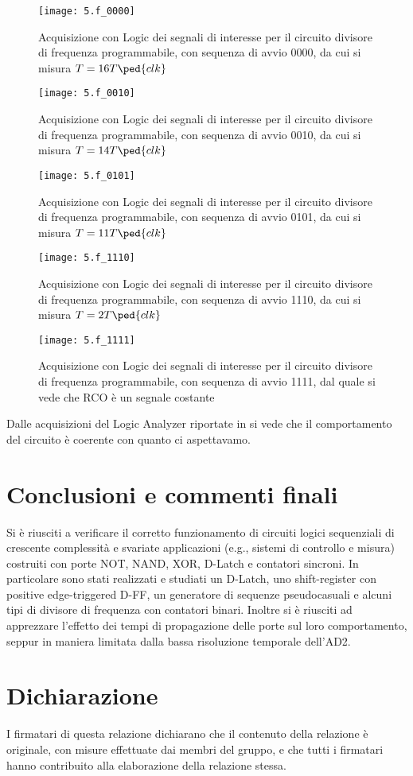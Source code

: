 \documentclass[10pt, a4paper, italian]{article}
\begin{document}
\begin{figure}[htbp]
\centering
	\texttt{[image: 5.f\_0000]}
	\caption{Acquisizione con Logic dei segnali di interesse per il circuito divisore di frequenza programmabile, con sequenza di avvio 0000, da cui si misura $T = 16 T\ped{clk}$
	 \label{fig: RCO_0000}}
\end{figure}
\begin{figure}[htbp]
\centering
	\texttt{[image: 5.f\_0010]}
	\caption{Acquisizione con Logic dei segnali di interesse per il circuito divisore di frequenza programmabile, con sequenza di avvio 0010, da cui si misura $T = 14 T\ped{clk}$
	 \label{fig: RCO_0010}}
\end{figure}
\begin{figure}[htbp]
\centering
	\texttt{[image: 5.f\_0101]}
	\caption{Acquisizione con Logic dei segnali di interesse per il circuito divisore di frequenza programmabile, con sequenza di avvio 0101, da cui si misura $T = 11 T\ped{clk}$
	 \label{fig: RCO_0101}}
\end{figure}
\begin{figure}[htbp]
\centering
	\texttt{[image: 5.f\_1110]}
	\caption{Acquisizione con Logic dei segnali di interesse per il circuito divisore di frequenza programmabile, con sequenza di avvio 1110, da cui si misura $T = 2 T\ped{clk}$
	 \label{fig: RCO_1110}}
\end{figure}
\begin{figure}[htbp]
\centering
	\texttt{[image: 5.f\_1111]}
	\caption{Acquisizione con Logic dei segnali di interesse per il circuito divisore di frequenza programmabile, con sequenza di avvio 1111, dal quale si vede che RCO è un segnale costante \label{fig: RCO_1111}}
\end{figure}

Dalle acquisizioni del Logic Analyzer riportate in si vede che il comportamento
del circuito è coerente con quanto ci aspettavamo.
\fi

\section*{Conclusioni e commenti finali}
Si è riusciti a verificare il corretto funzionamento di circuiti logici
sequenziali di crescente complessità e svariate applicazioni (e.g., sistemi di
controllo e misura) costruiti con porte NOT, NAND, XOR, D-Latch e contatori
sincroni.
In particolare sono stati realizzati e studiati un D-Latch, uno shift-register
con positive edge-triggered D-FF, un generatore di sequenze pseudocasuali e
alcuni tipi di divisore di frequenza con contatori binari.
Inoltre si è riusciti ad apprezzare l'effetto dei tempi di propagazione
delle porte sul loro comportamento, seppur in maniera limitata dalla bassa
risoluzione temporale dell'AD2.

\section*{Dichiarazione}
I firmatari di questa relazione dichiarano che il contenuto della relazione \`e
originale, con misure effettuate dai membri del gruppo, e che tutti i firmatari
hanno contribuito alla elaborazione della relazione stessa.
\end{document}
